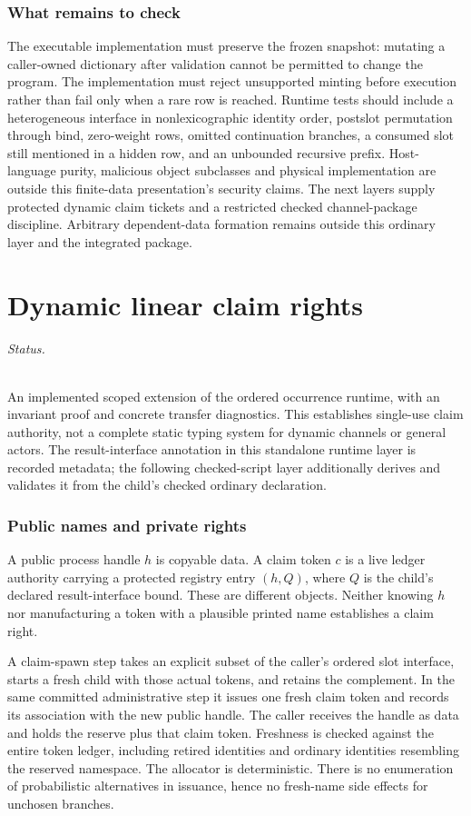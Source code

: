 \documentclass[11pt]{article}
\begin{document}
\section{What remains to check}
The executable implementation must preserve the frozen snapshot: mutating a caller-owned dictionary after validation cannot be permitted to change the program. The implementation must reject unsupported minting before execution rather than fail only when a rare row is reached. Runtime tests should include a heterogeneous interface in nonlexicographic identity order, postslot permutation through bind, zero-weight rows, omitted continuation branches, a consumed slot still mentioned in a hidden row, and an unbounded recursive prefix. Host-language purity, malicious object subclasses and physical implementation are outside this finite-data presentation's security claims. The next layers supply protected dynamic claim tickets and a restricted checked channel-package discipline. Arbitrary dependent-data formation remains outside this ordinary layer and the integrated package.

\part{Dynamic linear claim rights}

\paragraph{Status.} An implemented scoped extension of the ordered occurrence runtime, with an invariant proof and concrete transfer diagnostics. This establishes single-use claim authority, not a complete static typing system for dynamic channels or general actors. The result-interface annotation in this standalone runtime layer is recorded metadata; the following checked-script layer additionally derives and validates it from the child's checked ordinary declaration.

\section{Public names and private rights}
A public process handle $h$ is copyable data. A claim token $c$ is a live ledger authority carrying a protected registry entry $(h,Q)$, where $Q$ is the child's declared result-interface bound. These are different objects. Neither knowing $h$ nor manufacturing a token with a plausible printed name establishes a claim right.

A claim-spawn step takes an explicit subset of the caller's ordered slot interface, starts a fresh child with those actual tokens, and retains the complement. In the same committed administrative step it issues one fresh claim token and records its association with the new public handle. The caller receives the handle as data and holds the reserve plus that claim token. Freshness is checked against the entire token ledger, including retired identities and ordinary identities resembling the reserved namespace. The allocator is deterministic. There is no enumeration of probabilistic alternatives in issuance, hence no fresh-name side effects for unchosen branches.
\end{document}
